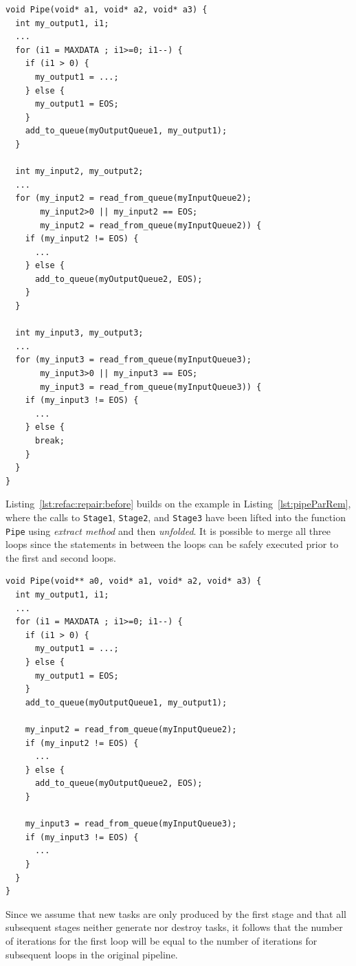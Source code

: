 %
\begin{lstlisting}[caption=Intermediate Code Repair Stage for Simple Pipeline Example, label=lst:refac:repair:before, frame=single]
void Pipe(void* a1, void* a2, void* a3) {
  int my_output1, i1;
  ...
  for (i1 = MAXDATA ; i1>=0; i1--) {
    if (i1 > 0) {
      my_output1 = ...;
    } else {
      my_output1 = EOS;
    }
    add_to_queue(myOutputQueue1, my_output1);
  }

  int my_input2, my_output2;
  ...
  for (my_input2 = read_from_queue(myInputQueue2);
       my_input2>0 || my_input2 == EOS;
       my_input2 = read_from_queue(myInputQueue2)) {
    if (my_input2 != EOS) {
      ...
    } else {
      add_to_queue(myOutputQueue2, EOS);
    }
  }

  int my_input3, my_output3;
  ...
  for (my_input3 = read_from_queue(myInputQueue3);
       my_input3>0 || my_input3 == EOS;
       my_input3 = read_from_queue(myInputQueue3)) {
    if (my_input3 != EOS) {
      ...
    } else {
      break;
    }
  }
}
\end{lstlisting}
%
\noindent
Listing~\ref{lst:refac:repair:before} builds on the example in Listing~\ref{lst:pipeParRem}, where the calls to \lstinline|Stage1|, \lstinline|Stage2|, and \lstinline|Stage3| have been lifted into the function \lstinline|Pipe| using \emph{extract method} and then \emph{unfolded}.
%
It is possible to merge all three loops since the statements in between the loops can be safely executed prior to the first and second loops.
%
\begin{lstlisting}[caption=Following Merging of loops in Listing~\ref{lst:refac:repair:before}, label=lst:refac:repair:after, frame=single]
void Pipe(void** a0, void* a1, void* a2, void* a3) {
  int my_output1, i1;
  ...
  for (i1 = MAXDATA ; i1>=0; i1--) {
    if (i1 > 0) {
      my_output1 = ...;
    } else {
      my_output1 = EOS;
    }
    add_to_queue(myOutputQueue1, my_output1);

    my_input2 = read_from_queue(myInputQueue2);
    if (my_input2 != EOS) {
      ...
    } else {
      add_to_queue(myOutputQueue2, EOS);
    }

    my_input3 = read_from_queue(myInputQueue3);
    if (my_input3 != EOS) {
      ...
    }
  }
}

\end{lstlisting}
%
Since we assume that new tasks are only produced by the first stage and that all subsequent stages neither generate nor destroy tasks, it follows that the number of iterations for the first loop will be equal to the number of iterations for subsequent loops in the original pipeline.

